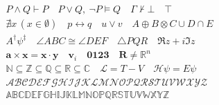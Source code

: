\begin{gather*}
P \wedge Q \vdash P \quad P \vee Q,\ \neg P \models Q \quad \Gamma \nvdash \bot \quad \top \\
\nexists x\,(x \in \emptyset) \quad p \leftrightarrow q \quad u \vee v \quad A \oplus B \otimes C \cup D \cap E \\
A^\dagger \psi^\ddagger \quad \angle ABC \cong \angle DEF \quad \triangle PQR \quad \Re z + i \Im z \\
\mathbf{a} \times \mathbf{x} = \mathbf{x} \cdot \mathbf{y} \quad \mathbf{v}_i \quad \mathbf{0123} \quad \mathbf{R} \ne \mathbb{R}^n \\
\mathbb{N} \subseteq \mathbb{Z} \subseteq \mathbb{Q} \subseteq \mathbb{R} \subseteq \mathbb{C} \quad \mathcal{L} = T - V \quad \mathcal{H}\psi = E\psi \\
\mathcal{ABCDEFGHIJKLMNOPQRSTUVWXYZ} \\
\mathbb{ABCDEFGHIJKLMNOPQRSTUVWXYZ}
\end{gather*}
